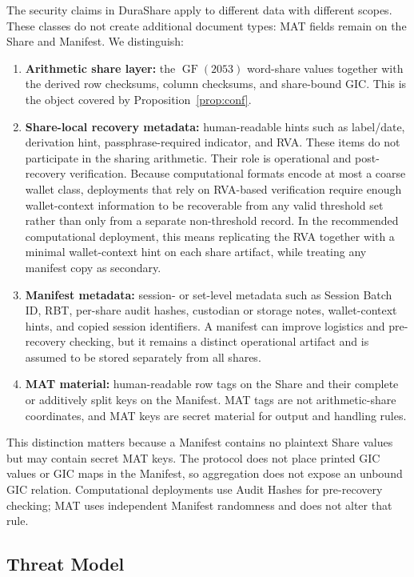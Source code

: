 \documentclass[11pt]{article}
\newcommand{\GF}{\operatorname{GF}}
\begin{document}
The security claims in DuraShare apply to different data with different scopes. These classes do not create additional document types: MAT fields remain on the Share and Manifest. We distinguish:
\begin{enumerate}[noitemsep]
    \item \textbf{Arithmetic share layer:} the $\GF(2053)$ word-share values together with the derived row checksums, column checksums, and share-bound GIC. This is the object covered by Proposition~\ref{prop:conf}.
    \item \textbf{Share-local recovery metadata:} human-readable hints such as label/date, derivation hint, passphrase-required indicator, and RVA. These items do not participate in the sharing arithmetic. Their role is operational and post-recovery verification. Because computational formats encode at most a coarse wallet class, deployments that rely on RVA-based verification require enough wallet-context information to be recoverable from any valid threshold set rather than only from a separate non-threshold record. In the recommended computational deployment, this means replicating the RVA together with a minimal wallet-context hint on each share artifact, while treating any manifest copy as secondary.
    \item \textbf{Manifest metadata:} session- or set-level metadata such as Session Batch ID, RBT, per-share audit hashes, custodian or storage notes, wallet-context hints, and copied session identifiers. A manifest can improve logistics and pre-recovery checking, but it remains a distinct operational artifact and is assumed to be stored separately from all shares.
    \item \textbf{MAT material:} human-readable row tags on the Share and their complete or additively split keys on the Manifest. MAT tags are not arithmetic-share coordinates, and MAT keys are secret material for output and handling rules.
\end{enumerate}

This distinction matters because a Manifest contains no plaintext Share values but may contain secret MAT keys. The protocol does not place printed GIC values or GIC maps in the Manifest, so aggregation does not expose an unbound GIC relation. Computational deployments use Audit Hashes for pre-recovery checking; MAT uses independent Manifest randomness and does not alter that rule.

\subsection{Threat Model}
\label{sec:threat-model}
\end{document}
